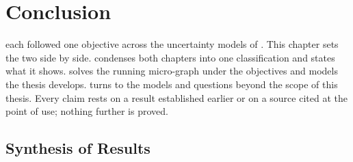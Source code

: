 %
%
%

\chapter{Conclusion}\label{ch:conclusion}

 each followed one objective across the uncertainty models of . This chapter sets the two side by side.
 condenses both chapters into one classification and states what it shows.
 solves the running micro-graph under the objectives and models the thesis develops.
 turns to the models and questions beyond the scope of this thesis.
Every claim rests on a result established earlier or on a source cited at the point of use; nothing further is proved.

\section{Synthesis of Results}\label{sec:synthesis}

